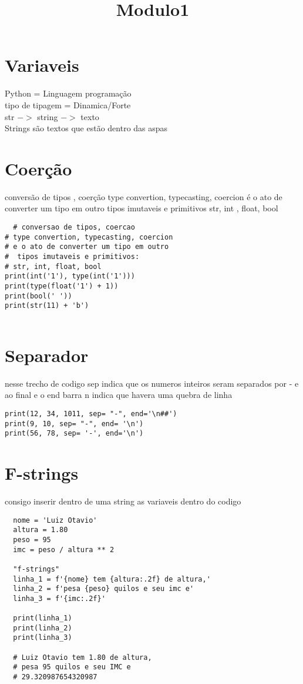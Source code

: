 \documentclass{article}
\date{} %
\title{Modulo1}
\begin{document}
\maketitle
\tableofcontents
\newpage

\section{Variaveis}
Python = Linguagem programação\\
tipo de tipagem = Dinamica/Forte\\
str $->$ string $->$ texto\\
Strings são textos que estão dentro das aspas
\section{Coerção}
conversão de tipos , coerção
type convertion, typecasting, coercion
é o ato de converter um tipo em outro
tipos imutaveis e primitivos
str, int , float, bool 

\begin{lstlisting}
  # conversao de tipos, coercao
# type convertion, typecasting, coercion
# e o ato de converter um tipo em outro
#  tipos imutaveis e primitivos:
# str, int, float, bool
print(int('1'), type(int('1')))
print(type(float('1') + 1))
print(bool(' '))
print(str(11) + 'b')


\end{lstlisting}
\section{Separador}
nesse trecho de codigo  sep indica que os numeros inteiros seram separados
por - e ao final e o end barra n indica que havera uma quebra de linha
\begin{lstlisting}
print(12, 34, 1011, sep= "-", end='\n##')
print(9, 10, sep= "-", end= '\n')
print(56, 78, sep= '-', end='\n')
\end{lstlisting}
\section{F-strings}
consigo inserir dentro de uma string as variaveis dentro do codigo
\begin{lstlisting}
  nome = 'Luiz Otavio'
  altura = 1.80
  peso = 95
  imc = peso / altura ** 2
  
  "f-strings"
  linha_1 = f'{nome} tem {altura:.2f} de altura,'
  linha_2 = f'pesa {peso} quilos e seu imc e'
  linha_3 = f'{imc:.2f}'
  
  print(linha_1)
  print(linha_2)
  print(linha_3)
  
  # Luiz Otavio tem 1.80 de altura,
  # pesa 95 quilos e seu IMC e
  # 29.320987654320987
\end{lstlisting}  
\end{document}
